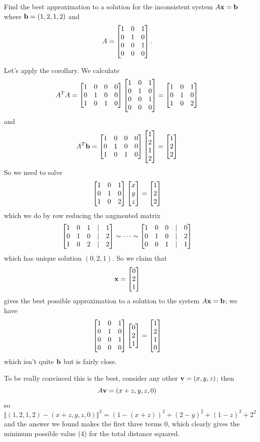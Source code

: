 \begin{myprob}
Find the best approximation to a solution for the inconsistent system $A\mathbf{x} = \mathbf{b}$ where $\mathbf{b} = (1,2,1,2)$ and
$$
A = \left[ \begin{matrix} 1 & 0 & 1 \\ 0 & 1 & 0 \\ 0 & 0 & 1\\ 0 & 0 & 0 \end{matrix} \right].
$$
 
\begin{mysol}
Let's apply
the corollary.
We calculate
$$
A^T A = \left[ \begin{matrix} 1 & 0 & 0 & 0\\ 0 & 1 & 0 & 0 \\ 1 & 0 & 1 & 0 \end{matrix} \right]
\left[ \begin{matrix} 1 & 0 & 1 \\ 0 & 1 & 0 \\ 0 & 0 & 1\\ 0 & 0 & 0 \end{matrix} \right]
=\left[ \begin{matrix} 1 & 0 & 1\\ 0 & 1 & 0 \\ 1 & 0 & 2 \end{matrix} \right]
$$
and 
$$
A^T\mathbf{b} = \left[ \begin{matrix} 1 & 0 & 0 & 0\\ 0 & 1 & 0 & 0 \\ 1 & 0 & 1 & 0 \end{matrix} \right]\left[ \begin{matrix} 1\\2\\1\\2 \end{matrix} \right] = \left[ \begin{matrix} 1 \\ 2\\ 2 \end{matrix} \right]
$$
So we need to solve
$$
\left[ \begin{matrix} 1 & 0 & 1\\ 0 & 1 & 0 \\ 1 & 0 & 2 \end{matrix} \right]\left[ \begin{matrix} x\\y\\z \end{matrix} \right] = \left[ \begin{matrix} 1 \\ 2\\ 2 \end{matrix} \right]
$$
which we do by row reducing the augmented matrix
$$
\left[ \begin{matrix} 1 & 0 & 1 &|& 1\\ 0 & 1 & 0 &|& 2\\ 1 & 0 & 2&|& 2 \end{matrix} \right]
\sim \cdots \sim
\left[ \begin{matrix} 
1 & 0 & 0 &|& 0\\ 
0 & 1 & 0 &|& 2\\ 
0 & 0 & 1&|& 1 \end{matrix} \right]
$$
which has unique solution $(0,2,1)$.  So we claim that
$$
\mathbf{x}=\left[ \begin{matrix} 0\\2\\1 \end{matrix} \right]
$$
gives the best possible approximation to a solution to the
system $A \mathbf{x} = \mathbf{b}$; we have
$$
\left[ \begin{matrix} 1 & 0 & 1 \\ 0 & 1 & 0 \\ 0 & 0 & 1\\ 0 & 0 & 0 \end{matrix} \right]\left[ \begin{matrix} 0\\2\\1 \end{matrix} \right] = \left[ \begin{matrix} 1\\2\\1\\0 \end{matrix} \right]
$$
which isn't quite $\mathbf{b}$ but is fairly close.

To be really convinced this is the best, consider any other $\mathbf{v}=(x,y,z)$;
then 
$$
A\mathbf{v} = (x+z, y, z, 0)
$$
so 
$$
\Vert (1,2,1,2) - (x+z, y, z, 0) \Vert^2 = (1-(x+z))^2 + (2-y)^2 + (1-z)^2 + 2^2 
$$
and the answer we found makes the first three terms 0, which clearly gives the 
minimum possible value (4) for the total distance squared.
\end{mysol}\end{myprob}




